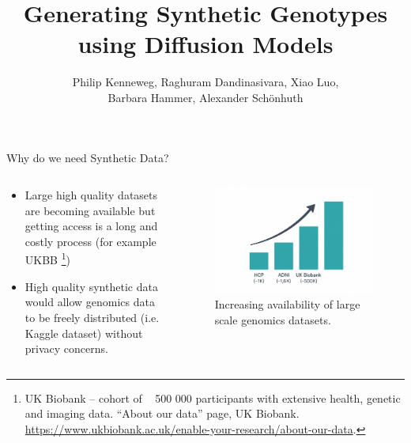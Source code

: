 \documentclass[compress, aspectratio=169]{beamer}
\title{Generating Synthetic Genotypes using Diffusion
Models}
\author{\small Philip Kenneweg, Raghuram Dandinasivara, Xiao Luo,\\ Barbara Hammer, Alexander Schönhuth }
\institute{University Bielefeld}
\begin{document}
\begin{frame}[plain] %
    \titlepage
\end{frame}


\begin{frame}{Why do we need Synthetic Data?}


  \begin{columns}
\begin{column}{0.48\textwidth}
    \begin{itemize}
  \item Large high quality datasets are becoming available but getting access is a long and costly process (for example UKBB \footnote[frame]{\tiny  UK Biobank – cohort of ~ 500 000 participants with extensive health, genetic and imaging data. “About our data” page, UK Biobank. \url{https://www.ukbiobank.ac.uk/enable-your-research/about-our-data}. })
   \item High quality synthetic data would allow genomics data to be freely distributed (i.e. Kaggle dataset) without privacy concerns. 

  \end{itemize}
\end{column}
\begin{column}{0.48\textwidth}
\begin{figure}
    \centering
    \includegraphics[width=0.8\linewidth]{figures/dataset_growth.png}
    \caption{\small Increasing availability of large scale genomics datasets.}
    
\end{figure}
\end{column}

  \end{columns}

 

\end{frame}
\end{document}
